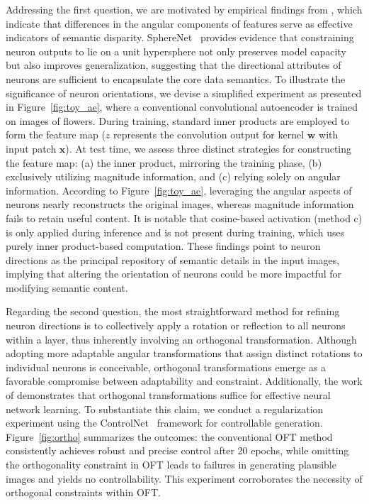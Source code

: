 Addressing the first question, we are motivated by empirical findings from \cite{liu2018decoupled,chen2020angular}, which indicate that differences in the angular components of features serve as effective indicators of semantic disparity. SphereNet~\cite{liu2017deep} provides evidence that constraining neuron outputs to lie on a unit hypersphere not only preserves model capacity but also improves generalization, suggesting that the directional attributes of neurons are sufficient to encapsulate the core data semantics. To illustrate the significance of neuron orientations, we devise a simplified experiment as presented in Figure~\ref{fig:toy_ae}, where a conventional convolutional autoencoder is trained on images of flowers. During training, standard inner products are employed to form the feature map ($z$ represents the convolution output for kernel $\bm{w}$ with input patch $\bm{x}$). At test time, we assess three distinct strategies for constructing the feature map: (a) the inner product, mirroring the training phase, (b) exclusively utilizing magnitude information, and (c) relying solely on angular information. According to Figure~\ref{fig:toy_ae}, leveraging the angular aspects of neurons nearly reconstructs the original images, whereas magnitude information fails to retain useful content. It is notable that cosine-based activation (method c) is only applied during inference and is not present during training, which uses purely inner product-based computation. These findings point to neuron directions as the principal repository of semantic details in the input images, implying that altering the orientation of neurons could be more impactful for modifying semantic content.

Regarding the second question, the most straightforward method for refining neuron directions is to collectively apply a rotation or reflection to all neurons within a layer, thus inherently involving an orthogonal transformation. Although adopting more adaptable angular transformations that assign distinct rotations to individual neurons is conceivable, orthogonal transformations emerge as a favorable compromise between adaptability and constraint. Additionally, the work of \cite{liu2021orthogonal} demonstrates that orthogonal transformations suffice for effective neural network learning. To substantiate this claim, we conduct a regularization experiment using the ControlNet~\cite{zhang2023adding} framework for controllable generation. Figure~\ref{fig:ortho} summarizes the outcomes: the conventional OFT method consistently achieves robust and precise control after 20 epochs, while omitting the orthogonality constraint in OFT leads to failures in generating plausible images and yields no controllability. This experiment corroborates the necessity of orthogonal constraints within OFT.

